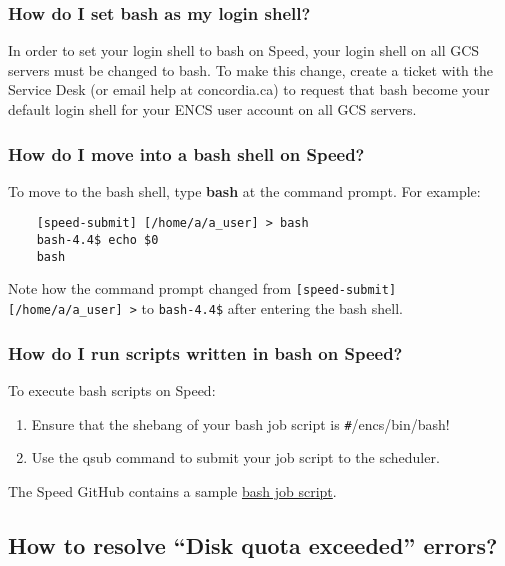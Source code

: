 \subsubsection{How do I set bash as my login shell?}

In order to set your login shell to bash on Speed, your login shell on all GCS servers must be changed to bash.
To make this change, create a ticket with the Service Desk (or email help at concordia.ca) to request that bash become your default login shell for your ENCS user account on all GCS servers.

\subsubsection{How do I move into a bash shell on Speed?}

To move to the bash shell, type \textbf{bash} at the command prompt.
For example:
\begin{verbatim}
	[speed-submit] [/home/a/a_user] > bash
	bash-4.4$ echo $0
	bash
\end{verbatim}	

Note how the command prompt changed from \verb![speed-submit] [/home/a/a_user] >! to \verb!bash-4.4$! after entering the bash shell.

\subsubsection{How do I run scripts written in bash on Speed?}

To execute bash scripts on Speed:
\begin{enumerate}
	\item 
Ensure that the shebang of your bash job script is \verb!#!/encs/bin/bash!
	\item 
Use the qsub command to submit your job script to the scheduler.
\end{enumerate}

The Speed GitHub contains a sample \href{https://github.com/NAG-DevOps/speed-hpc/blob/master/src/bash.sh}{bash job script}.  

\subsection{How to resolve ``Disk quota exceeded'' errors?}

